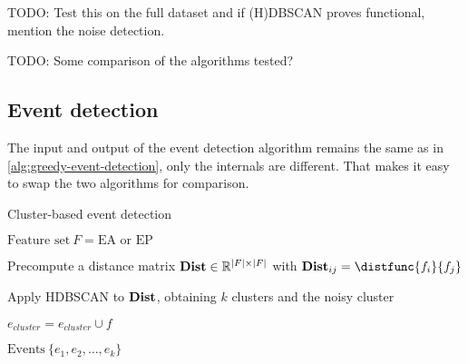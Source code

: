 {\color{red} TODO: Test this on the full dataset and if (H)DBSCAN proves functional, mention the noise detection.}

{\color{blue} TODO: Some comparison of the algorithms tested?}


\subsection{Event detection}
The input and output of the event detection algorithm remains the same as in \ref{alg:greedy-event-detection}, only the internals are different. That makes it easy to swap the two algorithms for comparison.

\begin{algorithm}[H]
\begin{algorithmic}[1]
\caption{Cluster-based event detection}
\Input $\text{Feature set} ~ F = \text{EA or EP}$

\State Precompute a distance matrix $\mathbf{Dist} \in \mathbb{R}^{\left\vert F \right\vert \times \left\vert F \right\vert}$ with $\distmat_{ij} = \distfunc{f_{i}}{f_{j}}$

\State Apply HDBSCAN to $\mathbf{Dist}$, obtaining $k$ clusters and the noisy cluster

		\State $e_{cluster} = e_{cluster} \cup f$
	\EndIf
\EndFor

\Output $\text{Events} ~ \{ e_{1}, e_{2}, \dots, e_{k} \}$
\end{algorithmic}
\end{algorithm}
